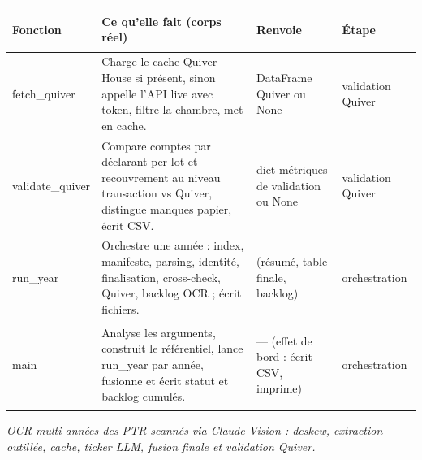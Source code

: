 \documentclass[11pt,a4paper]{article}
\makeatletter
\newenvironment{fnt}{%
  \par\footnotesize
  \setlength{\tabcolsep}{3pt}%
  \begin{longtable}{@{}>{\ttfamily\scriptsize\raggedright\arraybackslash}p{3.0cm} >{\raggedright\arraybackslash}p{7.5cm} >{\itshape\scriptsize\raggedright\arraybackslash}p{2.7cm} >{\scriptsize\raggedright\arraybackslash}p{1.85cm}@{}}
  \toprule
  \normalfont\bfseries\scriptsize Fonction & \bfseries\scriptsize Ce qu'elle fait (corps réel) &
  \normalfont\bfseries\scriptsize Renvoie & \normalfont\bfseries\scriptsize Étape\\
  \midrule\endhead
}{\bottomrule\end{longtable}\par}
\newcommand{\fnmod}[2]{\par\smallskip\noindent{\ttfamily\bfseries #1}\;\textmd{\itshape\small\textemdash{} #2}\par\nobreak\vspace{2pt}}
\makeatother
\begin{document}
\begin{fnt}
fetch_\allowbreak quiver & Charge le cache Quiver House si présent,\allowbreak{} sinon appelle l'API live avec token,\allowbreak{} filtre la chambre,\allowbreak{} met en cache. & DataFrame Quiver ou None & validation Quiver \\
validate_\allowbreak quiver & Compare comptes par déclarant per-lot et recouvrement au niveau transaction vs Quiver,\allowbreak{} distingue manques papier,\allowbreak{} écrit CSV. & dict métriques de validation ou None & validation Quiver \\
run_\allowbreak year & Orchestre une année : index,\allowbreak{} manifeste,\allowbreak{} parsing,\allowbreak{} identité,\allowbreak{} finalisation,\allowbreak{} cross-check,\allowbreak{} Quiver,\allowbreak{} backlog OCR ; écrit fichiers. & (résumé,\allowbreak{} table finale,\allowbreak{} backlog)\allowbreak{} & orchestration \\
main & Analyse les arguments,\allowbreak{} construit le référentiel,\allowbreak{} lance run_year par année,\allowbreak{} fusionne et écrit statut et backlog cumulés. & — (effet de bord : écrit CSV,\allowbreak{} imprime)\allowbreak{} & orchestration \\
\end{fnt}
\fnmod{ocr.py}{OCR multi-années des PTR scannés via Claude Vision : deskew, extraction outillée, cache, ticker LLM, fusion finale et validation Quiver.}
\end{document}
